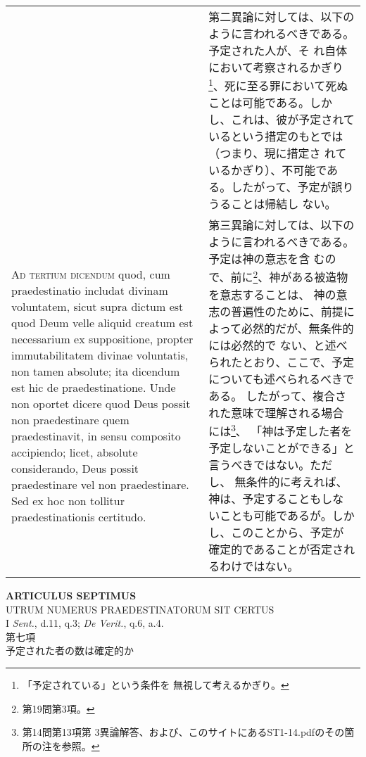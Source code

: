 \documentclass[10pt]{jsarticle} %
\begin{document}
\begin{longtable}{p{21em}p{21em}}
&


第二異論に対しては、以下のように言われるべきである。予定された人が、そ
れ自体において考察されるかぎり\footnote{「予定されている」という条件を
無視して考えるかぎり。}、死に至る罪において死ぬことは可能である。しか
し、これは、彼が予定されているという措定のもとでは（つまり、現に措定さ
れているかぎり）、不可能である。したがって、予定が誤りうることは帰結し
ない。

\\


{\scshape Ad tertium dicendum} quod, cum praedestinatio
includat divinam voluntatem, sicut supra dictum est quod Deum velle
aliquid creatum est necessarium ex suppositione, propter immutabilitatem
divinae voluntatis, non tamen absolute; ita dicendum est hic de
praedestinatione. Unde non oportet dicere quod Deus possit non
praedestinare quem praedestinavit, in sensu composito accipiendo; licet,
absolute considerando, Deus possit praedestinare vel non
praedestinare. Sed ex hoc non tollitur praedestinationis certitudo.

&

第三異論に対しては、以下のように言われるべきである。予定は神の意志を含
むので、前に\footnote{第19問第3項。}、神がある被造物を意志することは、
神の意志の普遍性のために、前提によって必然的だが、無条件的には必然的で
ない、と述べられたとおり、ここで、予定についても述べられるべきである。
したがって、複合された意味で理解される場合には\footnote{第14問第13項第
3異論解答、および、このサイトにあるST1-14.pdfのその箇所の注を参照。}、
「神は予定した者を予定しないことができる」と言うべきではない。ただし、
無条件的に考えれば、神は、予定することもしないことも可能であるが。しか
し、このことから、予定が確定的であることが否定されるわけではない。


\end{longtable}
\newpage

\begin{center}
 {\Large {\bf ARTICULUS SEPTIMUS}}\\
 {\large UTRUM NUMERUS PRAEDESTINATORUM SIT CERTUS}\\
 {\footnotesize I {\itshape Sent.}, d.11, q.3; {\itshape De Verit.},
 q.6, a.4.}\\
 {\Large 第七項\\予定された者の数は確定的か}
\end{center}
\end{document}
